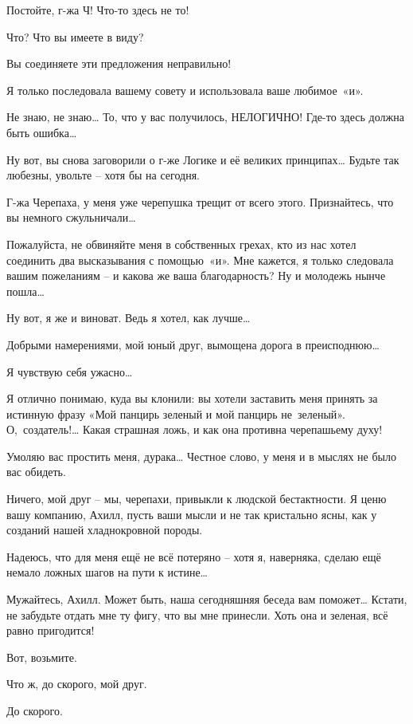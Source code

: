 \documentclass[../main.tex]{subfiles}
\begin{document}
\begin{dialogue}
 Постойте, г-жа Ч! Что-то здесь не то!

 Что? Что вы имеете в виду?

 Вы соединяете эти предложения неправильно!

 Я только последовала вашему совету и использовала ваше любимое~«и».

 Не знаю, не знаю\ldots{} То, что у вас получилось, НЕЛОГИЧНО! Где-то здесь должна быть ошибка\ldots{}

 Ну вот, вы снова заговорили о г-же Логике и её великих принципах\ldots{} Будьте так любезны, увольте \--- хотя бы на сегодня.

 Г-жа Черепаха, у меня уже черепушка трещит от всего этого. Признайтесь, что вы немного сжульничали\ldots{}

 Пожалуйста, не обвиняйте меня в собственных грехах, кто из нас хотел соединить два высказывания с помощью~«и». Мне кажется, я только следовала вашим пожеланиям \--- и какова же ваша благодарность? Ну и молодежь нынче пошла\ldots{}

 Ну вот, я же и виноват. Ведь я хотел, как лучше\ldots{}

 Добрыми намерениями, мой юный друг, вымощена дорога в преисподнюю\ldots{}

 Я чувствую себя ужасно\ldots{}

 Я отлично понимаю, куда вы клонили: вы хотели заставить меня принять за истинную фразу «Мой панцирь зеленый и мой панцирь не~зеленый». О,~создатель!\ldots{} Какая страшная ложь, и как она противна черепашьему духу!

 Умоляю вас простить меня, дурака\ldots{} Честное слово, у меня и в мыслях не было вас обидеть.

 Ничего, мой друг \--- мы, черепахи, привыкли к людской бестактности. Я ценю вашу компанию, Ахилл, пусть ваши мысли и не так кристально ясны, как у созданий нашей хладнокровной породы.

 Надеюсь, что для меня ещё не всё потеряно \--- хотя я, наверняка, сделаю ещё немало ложных шагов на пути к истине\ldots{}

 Мужайтесь, Ахилл. Может быть, наша сегодняшняя беседа вам поможет\ldots{} Кстати, не забудьте отдать мне ту фигу, что вы мне принесли. Хоть она и зеленая, всё равно пригодится!

 Вот, возьмите.

 Что ж, до скорого, мой друг.

 До скорого.

\end{dialogue}
\end{document}
